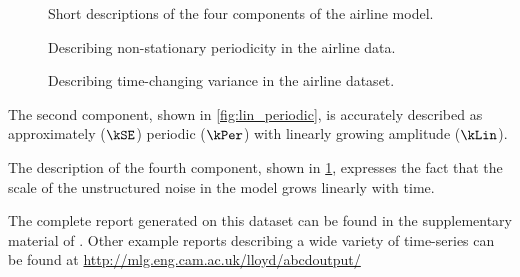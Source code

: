 \begin{figure}[ht!]
\centering
{}
\caption[Short descriptions of the four components of the airline model]
{Short descriptions of the four components of the airline model.}
\label{fig:exec-airline}
%
\centering
{}
\caption[Describing non-stationary periodicity in the airline data]
{Describing non-stationary periodicity in the airline data.}
\label{fig:lin_periodic}
%
\centering
{}
\caption[Describing time-changing variance in the airline dataset]
{Describing time-changing variance in the airline dataset.}
\label{fig:heteroscedastic}
\end{figure}

The second component, shown in \cref{fig:lin_periodic}, is accurately described as approximately ($\kSE$) periodic ($\kPer$) with linearly growing amplitude ($\kLin$).

The description of the fourth component, shown in \cref{fig:heteroscedastic}, expresses the fact that the scale of the unstructured noise in the model grows linearly with time.

The complete report generated on this dataset can be found in the supplementary material of \citet{LloDuvGroetal14}.
Other example reports describing a wide variety of time-series can be found at \url{http://mlg.eng.cam.ac.uk/lloyd/abcdoutput/}


